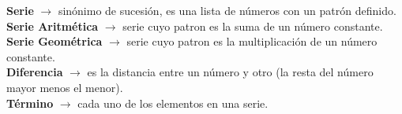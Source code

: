 \begin{defcard}
    \textbf{Serie}	$\rightarrow$ sinónimo de sucesión, es una lista de números con un patrón definido.\\
    \textbf{Serie Aritmética} $\rightarrow$ serie cuyo patron es la suma de un número constante.\\
    \textbf{Serie Geométrica} $\rightarrow$ serie cuyo patron es la multiplicación de un número constante.\\
    \textbf{Diferencia} $\rightarrow$ es la distancia entre un número y otro (la resta del número mayor menos el menor).\\
    \textbf{Término} $\rightarrow$ cada uno de los elementos en una serie.
\end{defcard}